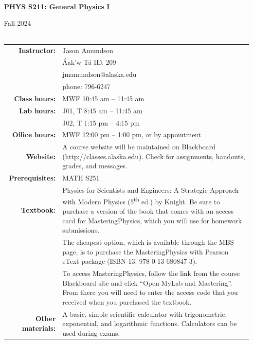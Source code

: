 \documentclass[11pt,letterpaper]{article}
\newcommand{\squeezeup}{\vspace{-2.5mm}}
\newcommand{\tablespace}[0]{\vspace{8pt}}
\begin{document}
\begin{centering}
\textbf{PHYS S211: General Physics I}

Fall 2024\\
\hfill{}\\

\bigskip
\begin{table}[h]
\centering
\setlength{\extrarowheight}{2pt}
\squeezeup
\begin{tabular}{@{}r@{\hspace{0.1in}}p{4.25in}} 
{\bf Instructor:} & Jason Amundson\\
& {\'A}ak'w T{\'a} H{\'i}t 209 \\
& jmamundson@alaska.edu\\
& phone: 796-6247 \tablespace\\
{\bf Class hours:} & MWF 10:45 am -- 11:45 am \tablespace\\
{\bf Lab hours:} & J01, T 8:45 am -- 11:45 am\\
& J02, T 1:15 pm -- 4:15 pm \tablespace\\
{\bf Office hours:} & MWF 12:00 pm -- 1:00 pm, or by appointment\tablespace\\
{\bf Website:} & A course website will be maintained on Blackboard (http://classes.alaska.edu). Check for assignments, handouts, grades, and messages.\tablespace\\
{\bf Prerequisites:} & MATH S251\tablespace\\
{\bf Textbook:} & Physics for Scientists and Engineers: A Strategic Approach with Modern Physics (5\textsuperscript{th} ed.) by Knight. Be sure to purchase a version of the book that comes with an access card for MasteringPhysics, which you will use for homework submissions.
\tablespace\\
& The cheapest option, which is available through the MBS page, is to purchase the MasteringPhysics with Pearson eText package (ISBN-13: 978-0-13-680847-3).
\tablespace\\
& To access MasteringPhysics, follow the link from the course Blackboard site and click ``Open MyLab and Mastering''. From there you will need to enter the access code that you received when you purchased the textbook.  \tablespace\\
{\bf Other materials:} & A basic, simple scientific calculator with trigonometric, exponential, and logarithmic functions. Calculators can be used during exams.
\end{tabular}
\end{table}
\end{centering}
\end{document}
